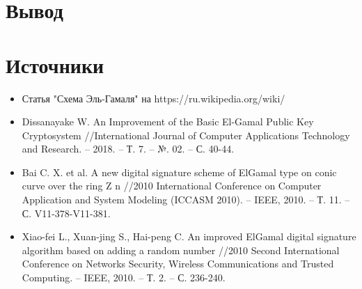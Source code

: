 \documentclass[a4paper]{article}
\begin{document}
\section*{Вывод}
\section*{Источники}
\begin{itemize}
    \item Статья "Схема Эль-Гамаля" на https://ru.wikipedia.org/wiki/
    \item Dissanayake W. An Improvement of the Basic El-Gamal Public Key Cryptosystem //International Journal of Computer Applications Technology and Research. – 2018. – Т. 7. – №. 02. – С. 40-44.
    \item Bai C. X. et al. A new digital signature scheme of ElGamal type on conic curve over the ring Z n //2010 International Conference on Computer Application and System Modeling (ICCASM 2010). – IEEE, 2010. – Т. 11. – С. V11-378-V11-381.
    \item Xiao-fei L., Xuan-jing S., Hai-peng C. An improved ElGamal digital signature algorithm based on adding a random number //2010 Second International Conference on Networks Security, Wireless Communications and Trusted Computing. – IEEE, 2010. – Т. 2. – С. 236-240.
\end{itemize}
\end{document}
